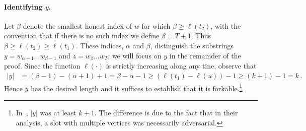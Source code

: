     \paragraph{Identifying $y$.}
    Let $\beta$ denote the smallest honest index of $w$ for which 
    $\beta \geq \ell(t_2)$, with the convention that if there is no such
    index we define $\beta = T + 1$. 
    Thus $\beta \geq \ell(t_2) \geq \ell(t_1)$.
    These indices, $\alpha$ and $\beta$, distinguish the
    substrings $y = w_{\alpha+1} \ldots w_{\beta-1}$ and 
    $z = w_{\beta} \ldots w_T$; 
    we will focus on $y$ in the remainder of the proof. 
    Since the function
    $\ell(\cdot)$ is strictly increasing along any tine, observe that
    \begin{align*}
        |y| 
        &= (\beta - 1) - (\alpha + 1) + 1 
        = \beta - \alpha - 1 
        \geq (\ell(t_1) - \ell(u)) - 1 
        \geq (k + 1) - 1 
        = k
        \,.
    \end{align*}
    Hence $y$ has the desired length and it suffices to establish that it is forkable.\footnote{
      In~\citet{LinearConsistency}, $|y|$ was at least $k + 1$. 
      The difference is due to the fact that 
      in their analysis, a slot with multiple vertices 
      was necessarily adversarial. 
    }

    
